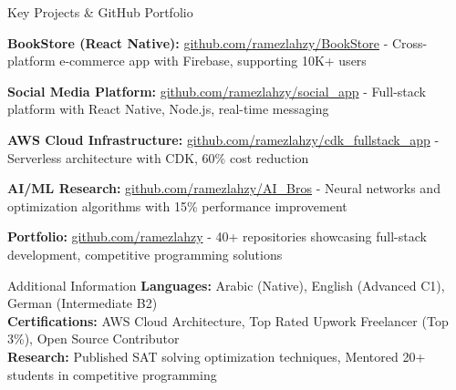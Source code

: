 \documentclass{resume}
\begin{document}

\begin{rSection}{Key Projects \& GitHub Portfolio}
\vspace{-0.1in}
\begin{rSubsection}{}{}{}{}
\item {\bf BookStore (React Native):} \href{https://github.com/ramezlahzy/BookStore}{github.com/ramezlahzy/BookStore} - Cross-platform e-commerce app with Firebase, supporting 10K+ users
\item {\bf Social Media Platform:} \href{https://github.com/ramezlahzy/social_app}{github.com/ramezlahzy/social\_app} - Full-stack platform with React Native, Node.js, real-time messaging
\item {\bf AWS Cloud Infrastructure:} \href{https://github.com/ramezlahzy/cdk_fullstack_app}{github.com/ramezlahzy/cdk\_fullstack\_app} - Serverless architecture with CDK, 60\% cost reduction
\item {\bf AI/ML Research:} \href{https://github.com/ramezlahzy/AI_Bros}{github.com/ramezlahzy/AI\_Bros} - Neural networks and optimization algorithms with 15\% performance improvement
\item {\bf Portfolio:} \href{https://github.com/ramezlahzy}{github.com/ramezlahzy} - 40+ repositories showcasing full-stack development, competitive programming solutions
\end{rSubsection}
\end{rSection}


\begin{rSection}{Additional Information}
\vspace{-0.1in}
{\bf Languages:} Arabic (Native), English (Advanced C1), German (Intermediate B2) \\
{\bf Certifications:} AWS Cloud Architecture, Top Rated Upwork Freelancer (Top 3\%), Open Source Contributor \\
{\bf Research:} Published SAT solving optimization techniques, Mentored 20+ students in competitive programming
\end{rSection}
\end{document}
